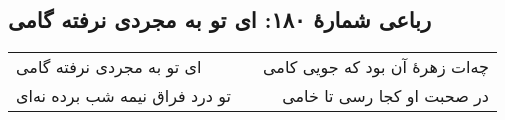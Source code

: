 \begin{center}
\section*{رباعی شمارهٔ ۱۸۰: ای تو به مجردی نرفته گامی}
\label{sec:180}
\begin{longtable}{l p{0.5cm} r}
ای تو به مجردی نرفته گامی
&&
چه‌ات زهرهٔ آن بود که جویی کامی
\\
تو درد فراق نیمه شب برده نه‌ای
&&
در صحبت او کجا رسی تا خامی
\\
\end{longtable}
\end{center}
